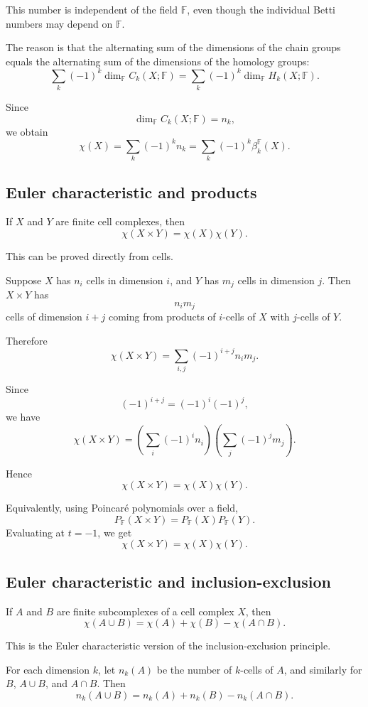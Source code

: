 \documentclass[12pt,a4paper]{article}
\theoremstyle{notespace}
\begin{document}
This number is independent of the field \(\mathbb F\), even though the individual Betti numbers may depend on \(\mathbb F\).

The reason is that the alternating sum of the dimensions of the chain groups equals the alternating sum of the dimensions of the homology groups:
\[
\sum_k (-1)^k\dim_{\mathbb F}C_k(X;\mathbb F)
=
\sum_k (-1)^k\dim_{\mathbb F}H_k(X;\mathbb F).
\]

Since
\[
\dim_{\mathbb F}C_k(X;\mathbb F)=n_k,
\]
we obtain
\[
\chi(X)
=
\sum_k (-1)^k n_k
=
\sum_k (-1)^k\beta_k^{\mathbb F}(X).
\]

\subsection{Euler characteristic and products}

If \(X\) and \(Y\) are finite cell complexes, then
\[
\chi(X\times Y)=\chi(X)\chi(Y).
\]

This can be proved directly from cells.

Suppose \(X\) has \(n_i\) cells in dimension \(i\), and \(Y\) has \(m_j\) cells in dimension \(j\). Then \(X\times Y\) has
\[
n_i m_j
\]
cells of dimension \(i+j\) coming from products of \(i\)-cells of \(X\) with \(j\)-cells of \(Y\).

Therefore
\[
\chi(X\times Y)
=
\sum_{i,j}(-1)^{i+j}n_i m_j.
\]

Since
\[
(-1)^{i+j}=(-1)^i(-1)^j,
\]
we have
\[
\chi(X\times Y)
=
\left(\sum_i(-1)^i n_i\right)
\left(\sum_j(-1)^j m_j\right).
\]

Hence
\[
\chi(X\times Y)=\chi(X)\chi(Y).
\]

Equivalently, using Poincaré polynomials over a field,
\[
P_{\mathbb F}(X\times Y)
=
P_{\mathbb F}(X)P_{\mathbb F}(Y).
\]
Evaluating at \(t=-1\), we get
\[
\chi(X\times Y)
=
\chi(X)\chi(Y).
\]

\subsection{Euler characteristic and inclusion-exclusion}

If \(A\) and \(B\) are finite subcomplexes of a cell complex \(X\), then
\[
\chi(A\cup B)=\chi(A)+\chi(B)-\chi(A\cap B).
\]

This is the Euler characteristic version of the inclusion-exclusion principle.

For each dimension \(k\), let \(n_k(A)\) be the number of \(k\)-cells of \(A\), and similarly for \(B\), \(A\cup B\), and \(A\cap B\). Then
\[
n_k(A\cup B)
=
n_k(A)+n_k(B)-n_k(A\cap B).
\]
\end{document}
